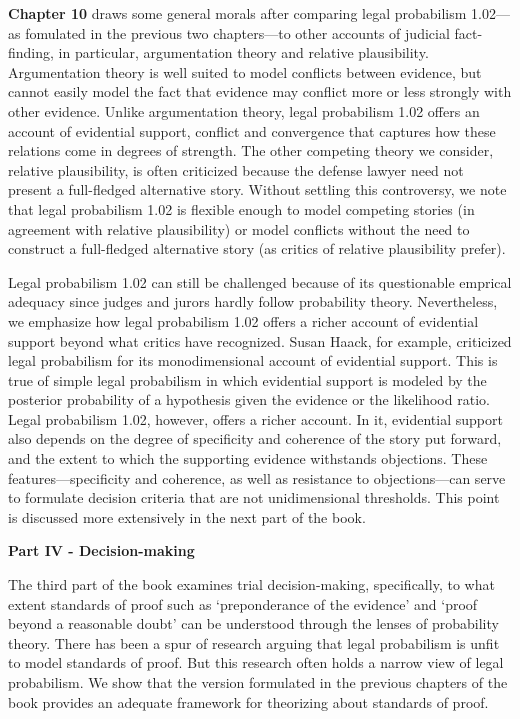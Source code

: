 \documentclass[
  10pt,
  dvipsnames,enabledeprecatedfontcommands]{scrartcl}
\begin{document}
\textbf{Chapter 10} draws some general morals after comparing legal
probabilism 1.02---as fomulated in the previous two chapters---to other
accounts of judicial fact-finding, in particular, argumentation theory
and relative plausibility. Argumentation theory is well suited to model
conflicts between evidence, but cannot easily model the fact that
evidence may conflict more or less strongly with other evidence. Unlike
argumentation theory, legal probabilism 1.02 offers an account of
evidential support, conflict and convergence that captures how these
relations come in degrees of strength. The other competing theory we
consider, relative plausibility, is often criticized because the defense
lawyer need not present a full-fledged alternative story. Without
settling this controversy, we note that legal probabilism 1.02 is
flexible enough to model competing stories (in agreement with relative
plausibility) or model conflicts without the need to construct a
full-fledged alternative story (as critics of relative plausibility
prefer).

Legal probabilism 1.02 can still be challenged because of its
questionable emprical adequacy since judges and jurors hardly follow
probability theory. Nevertheless, we emphasize how legal probabilism
1.02 offers a richer account of evidential support beyond what critics
have recognized. Susan Haack, for example, criticized legal probabilism
for its monodimensional account of evidential support. This is true of
simple legal probabilism in which evidential support is modeled by the
posterior probability of a hypothesis given the evidence or the
likelihood ratio. Legal probabilism 1.02, however, offers a richer
account. In it, evidential support also depends on the degree of
specificity and coherence of the story put forward, and the extent to
which the supporting evidence withstands objections. These
features---specificity and coherence, as well as resistance to
objections---can serve to formulate decision criteria that are not
unidimensional thresholds. This point is discussed more extensively in
the next part of the book.

\vspace{3mm}

\noindent \textbf{Part IV - Decision-making}

\noindent The third part of the book examines trial decision-making,
specifically, to what extent standards of proof such as `preponderance
of the evidence' and `proof beyond a reasonable doubt' can be understood
through the lenses of probability theory. There has been a spur of
research arguing that legal probabilism is unfit to model standards of
proof. But this research often holds a narrow view of legal probabilism.
We show that the version formulated in the previous chapters of the book
provides an adequate framework for theorizing about standards of proof.
\end{document}
